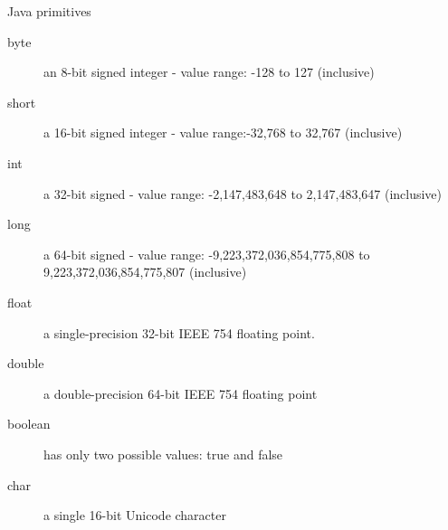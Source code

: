 {  \begin{frame}
    \begin{block}{Java primitives}
      \begin{description}
        \item[byte] an 8-bit signed integer - value range: -128 to 127 (inclusive)
        \item[short] a 16-bit signed  integer - value range:-32,768 to 32,767 (inclusive)
        \item[int] a 32-bit signed - value range: -2,147,483,648 to 2,147,483,647 (inclusive)
        \item[long] a 64-bit signed - value range: -9,223,372,036,854,775,808 to 9,223,372,036,854,775,807 (inclusive)
        \item[float] a single-precision 32-bit IEEE 754 floating point.
        \item[double] a double-precision 64-bit IEEE 754 floating point
        \item[boolean] has only two possible values: true and false
        \item[char] a single 16-bit Unicode character
      \end{description}
    \end{block}
  \end{frame}

}
